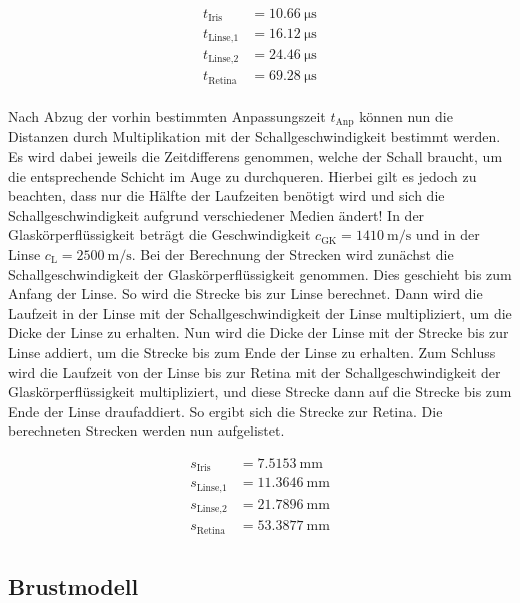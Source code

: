 \begin{align*}
    t_\text{Iris} &= \qty{10.66}{\micro\second}    \\ 
    t_\text{Linse,1} &= \qty{16.12}{\micro\second} \\
    t_\text{Linse,2} &= \qty{24.46}{\micro\second} \\
    t_\text{Retina} &= \qty{69.28}{\micro\second} \\
\end{align*}

\noindent Nach Abzug der vorhin bestimmten Anpassungszeit $t_\text{Anp}$ können nun die Distanzen durch Multiplikation mit der 
Schallgeschwindigkeit bestimmt werden. Es wird dabei jeweils die Zeitdifferens genommen, welche der Schall braucht, um die 
entsprechende Schicht im Auge zu durchqueren. Hierbei gilt es jedoch zu beachten, dass nur die Hälfte der Laufzeiten benötigt wird und sich 
die Schallgeschwindigkeit aufgrund verschiedener Medien ändert! In der Glaskörperflüssigkeit beträgt die Geschwindigkeit $c_\text{GK}=
\qty{1410}{\meter \per \second}$ und in der Linse $c_\text{L} = \qty{2500}{\meter \per \second}$. Bei der Berechnung der Strecken wird zunächst 
die Schallgeschwindigkeit der Glaskörperflüssigkeit genommen. Dies geschieht bis zum Anfang der Linse. So wird die Strecke bis zur Linse berechnet. 
Dann wird die Laufzeit in der Linse mit der Schallgeschwindigkeit der Linse multipliziert, um die Dicke der Linse zu erhalten. Nun wird die Dicke 
der Linse mit der Strecke bis zur Linse addiert, um die Strecke bis zum Ende der Linse zu erhalten. Zum Schluss wird die Laufzeit von der Linse 
bis zur Retina mit der Schallgeschwindigkeit der Glaskörperflüssigkeit multipliziert, und diese Strecke dann auf die Strecke bis zum Ende der Linse 
draufaddiert. So ergibt sich die Strecke zur Retina.
Die berechneten Strecken werden nun aufgelistet.


\begin{align*}
    s_\text{Iris} &= \qty{7.5153}{\milli\meter}     \\
    s_\text{Linse,1} &= \qty{11.3646}{\milli\meter} \\
    s_\text{Linse,2} &= \qty{21.7896}{\milli\meter} \\
    s_\text{Retina} &= \qty{53.3877}{\milli\meter} \\
\end{align*}

\subsection{Brustmodell}

